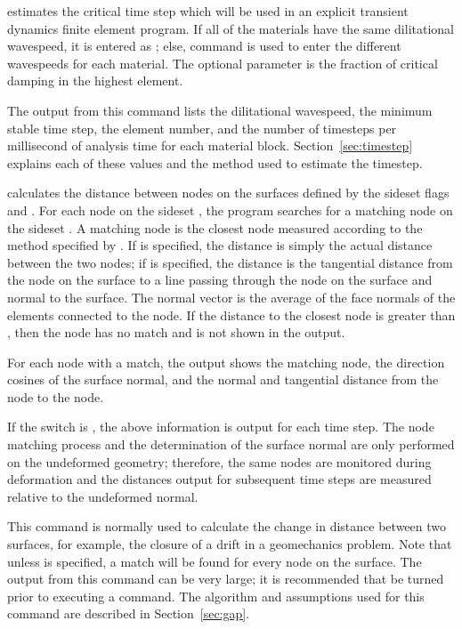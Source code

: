  {
 estimates the critical time step which will be used in an
explicit transient dynamics finite element program. If all of the
materials have the same dilitational wavespeed, it is entered as
; else, command  is used to enter the
different wavespeeds for each material.  The optional parameter
 is the fraction of critical damping in the
highest element. 

The output from this command lists the dilitational wavespeed, the
minimum stable time step, the element number, and the number of
timesteps per millisecond of analysis time for each material block.
Section~\ref{sec:timestep} explains each of these values and the method
used to estimate the timestep. 
} 

 {
 calculates the distance between nodes on the surfaces defined
by the sideset flags  and .  For each
node on the sideset , the program searches for a
matching node on the sideset .  A matching node is the
closest node measured according to the method specified by
.  If  is specified, the
distance is simply the actual distance between the two nodes; if
 is specified, the distance is the tangential distance from
the node on the  surface to a line passing through the
node on the  surface and normal to the surface.  The
normal vector is the average of the face normals of the elements
connected to the node.  If the distance to the closest 
node is greater than , then the  node
has no match and is not shown in the output. 

For each   node with a match, the output shows the
matching   node, the direction cosines of the surface
normal, and the normal and tangential distance from the
 node to the   node.

If the  switch is , the above information is output
for each time step.  The node matching process and the determination of
the surface normal are only performed on the undeformed geometry;
therefore, the same nodes are monitored during deformation and the
distances output for subsequent time steps are measured relative to the
undeformed normal. 

This command is normally used to calculate the change in distance
between two surfaces, for example, the closure of a drift in a
geomechanics problem.  Note that unless  is specified,
a match will be found for every node on the  surface.
The output from this command can be very large; it is recommended that
 be turned  prior to executing a  command.
The algorithm and assumptions used for this command are described in
Section~\ref{sec:gap}.
}

